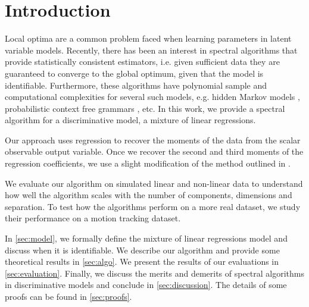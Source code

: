 \section{Introduction}
\label{sec:intro}

Local optima are a common problem faced when learning parameters in
latent variable models. Recently, there has been an interest in spectral
algorithms that provide statistically consistent estimators, i.e. given
sufficient data they are guaranteed to converge to the global optimum,
given that the model is identifiable. Furthermore, these algorithms have
polynomial sample and computational complexities for several such
models, e.g.  hidden Markov models \cite{anandkumar-hsu-kakade2012},
probabilistic context free grammars \cite{hsu-kakade-liang2012}, etc. In
this work, we provide a spectral algorithm for a discriminative model,
a mixture of linear regressions.


Our approach uses regression to recover the moments of the data from the
scalar observable output variable. Once we recover the second and third
moments of the regression coefficients, we use a slight modification of
the method outlined in \citet{anandkumar-hsu-kakade2012}.

We evaluate our algorithm on simulated linear and non-linear data to
understand how well the algorithm scales with the number of components,
dimensions and separation. To test how the algorithms perform on a more
real dataset, we study their performance on a motion tracking dataset.

In \autoref{sec:model}, we formally define the mixture of linear
regressions model and discuss when it is identifiable. We describe our
algorithm and provide some theoretical results in \autoref{sec:algo}. We
present the results of our evaluations in \autoref{sec:evaluation}.
Finally, we discuss the merits and demerits of spectral algorithms in
discriminative models and conclude in \autoref{sec:discussion}. The
details of some proofs can be found in \autoref{sec:proofs}.


